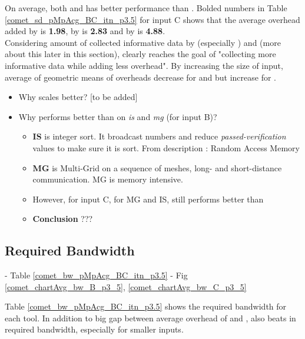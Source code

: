  
 
On average, both \parlotm and \parlota has better performance than \callgrind. Bolded numbers in Table \ref{comet_sd_pMpAcg_BC_itn_p3.5} for input C shows that the average overhead added by \parlotm is \textbf{1.98}, by \parlota is \textbf{2.83} and by \callgrind is \textbf{4.88}. 
\\
Considering amount of collected informative data by \parlot (especially \parlota) and \callgrind (more about this later in this section), clearly \parlot reaches the goal of "collecting more informative data while adding less overhead".
By increasing the size of input, average of geometric means of overheads decrease for \parlotm and \parlota but increase for \callgrind. 

\begin{itemize}
\item Why \callgrind scales better? [to be added]
\item Why \callgrind performs better than \parlot on \textit{is} and \textit{mg} (for input B)?
	\begin{itemize}
	\item \textbf{IS}  is integer sort. It broadcast numbers and reduce \textit{passed-verification} values to make sure it is sort. From description : Random Access Memory
	\item \textbf{MG}  is Multi-Grid on a sequence of meshes, long- and short-distance communication. MG is memory intensive.
	\item However, for input C, for MG and IS, \parlotm still performs better than \callgrind
	\item \textbf{Conclusion} ???
	\end{itemize}
\end{itemize}





  
\subsection{Required Bandwidth}
\label{subsec:lowbw}
 - Table \ref{comet_bw_pMpAcg_BC_itn_p3.5}
  - Fig \ref{comet_chartAvg_bw_B_p3_5}, \ref{comet_chartAvg_bw_C_p3_5}




Table \ref{comet_bw_pMpAcg_BC_itn_p3.5} shows the required bandwidth for each tool. 
In addition to big gap between average overhead of \parlotm and \callgrind, \parlotm also beats \callgrind in required bandwidth, especially for smaller inputs.

